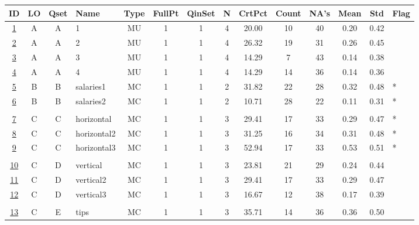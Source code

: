 \documentclass[12pt,english,nohyper]{tufte-handout}\usepackage[]{graphicx}\usepackage[]{color}
\begin{document}
\begin{longtable}{cccl|cccc|ccccc|l}
  \hline
ID & LO & Qset & Name & Type & FullPt & QinSet & N & CrtPct & Count & NA's & Mean & Std & Flag \\ 
  \hline
\hyperlink{T03.A.A.04.1.1.MU.1.2}{1} & A & A & 1 & MU &   1 &   1 &   4 & 20.00 &  10 &  40 & 0.20 & 0.42 &  \\ 
  \hyperlink{T03.A.A.04.1.1.MU.2.2}{2} & A & A & 2 & MU &   1 &   1 &   4 & 26.32 &  19 &  31 & 0.26 & 0.45 &  \\ 
  \hyperlink{T03.A.A.04.1.1.MU.3.2}{3} & A & A & 3 & MU &   1 &   1 &   4 & 14.29 &   7 &  43 & 0.14 & 0.38 &  \\ 
  \hyperlink{T03.A.A.04.1.1.MU.4.2}{4} & A & A & 4 & MU &   1 &   1 &   4 & 14.29 &  14 &  36 & 0.14 & 0.36 &  \\ 
  \hyperlink{T03.B.B.02.1.1.MC.salaries1.2}{5} & B & B & salaries1 & MC &   1 &   1 &   2 & 31.82 &  22 &  28 & 0.32 & 0.48 & * \\ 
  \hyperlink{T03.B.B.02.1.1.MC.salaries2.2}{6} & B & B & salaries2 & MC &   1 &   1 &   2 & 10.71 &  28 &  22 & 0.11 & 0.31 & * \\ 
   &  &  &  &  &  &  &  &  &  &  &  &  &  \\ 
  \hyperlink{T03.C.C.03.1.1.MC.horizontal.2}{7} & C & C & horizontal & MC &   1 &   1 &   3 & 29.41 &  17 &  33 & 0.29 & 0.47 & * \\ 
  \hyperlink{T03.C.C.03.1.1.MC.horizontal2.2}{8} & C & C & horizontal2 & MC &   1 &   1 &   3 & 31.25 &  16 &  34 & 0.31 & 0.48 & * \\ 
  \hyperlink{T03.C.C.03.1.1.MC.horizontal3.2}{9} & C & C & horizontal3 & MC &   1 &   1 &   3 & 52.94 &  17 &  33 & 0.53 & 0.51 & * \\ 
   &  &  &  &  &  &  &  &  &  &  &  &  &  \\ 
  \hyperlink{T03.C.D.03.1.1.MC.vertical.2}{10} & C & D & vertical & MC &   1 &   1 &   3 & 23.81 &  21 &  29 & 0.24 & 0.44 &  \\ 
  \hyperlink{T03.C.D.03.1.1.MC.vertical2.2}{11} & C & D & vertical2 & MC &   1 &   1 &   3 & 29.41 &  17 &  33 & 0.29 & 0.47 &  \\ 
  \hyperlink{T03.C.D.03.1.1.MC.vertical3.2}{12} & C & D & vertical3 & MC &   1 &   1 &   3 & 16.67 &  12 &  38 & 0.17 & 0.39 &  \\ 
   &  &  &  &  &  &  &  &  &  &  &  &  &  \\ 
  \hyperlink{T03.C.E.03.1.1.MC.tips.2}{13} & C & E & tips & MC &   1 &   1 &   3 & 35.71 &  14 &  36 & 0.36 & 0.50 &  \\ 

\end{longtable}
\end{document}
